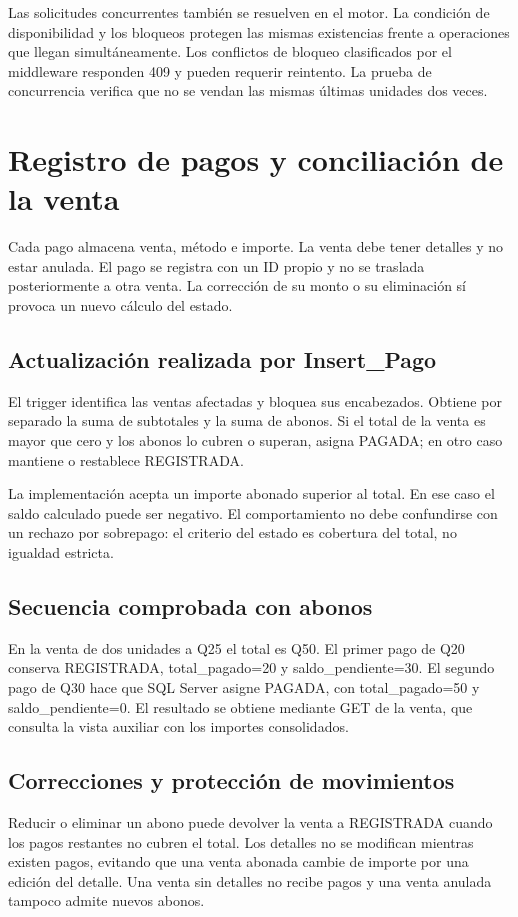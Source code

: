 Las solicitudes concurrentes también se resuelven en el motor. La condición de disponibilidad y los bloqueos protegen las mismas existencias frente a operaciones que llegan simultáneamente. Los conflictos de bloqueo clasificados por el middleware responden 409 y pueden requerir reintento. La prueba de concurrencia verifica que no se vendan las mismas últimas unidades dos veces.

\section{Registro de pagos y conciliación de la venta}
Cada pago almacena venta, método e importe. La venta debe tener detalles y no estar anulada. El pago se registra con un ID propio y no se traslada posteriormente a otra venta. La corrección de su monto o su eliminación sí provoca un nuevo cálculo del estado.

\subsection{Actualización realizada por Insert\_Pago}
El trigger identifica las ventas afectadas y bloquea sus encabezados. Obtiene por separado la suma de subtotales y la suma de abonos. Si el total de la venta es mayor que cero y los abonos lo cubren o superan, asigna PAGADA; en otro caso mantiene o restablece REGISTRADA.

La implementación acepta un importe abonado superior al total. En ese caso el saldo calculado puede ser negativo. El comportamiento no debe confundirse con un rechazo por sobrepago: el criterio del estado es cobertura del total, no igualdad estricta.

\subsection{Secuencia comprobada con abonos}
En la venta de dos unidades a Q25 el total es Q50. El primer pago de Q20 conserva REGISTRADA, total\_pagado=20 y saldo\_pendiente=30. El segundo pago de Q30 hace que SQL Server asigne PAGADA, con total\_pagado=50 y saldo\_pendiente=0. El resultado se obtiene mediante GET de la venta, que consulta la vista auxiliar con los importes consolidados.


\subsection{Correcciones y protección de movimientos}
Reducir o eliminar un abono puede devolver la venta a REGISTRADA cuando los pagos restantes no cubren el total. Los detalles no se modifican mientras existen pagos, evitando que una venta abonada cambie de importe por una edición del detalle. Una venta sin detalles no recibe pagos y una venta anulada tampoco admite nuevos abonos.

